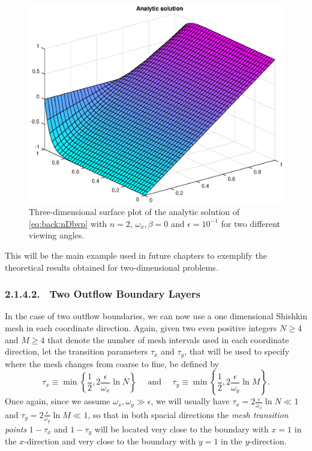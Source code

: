 \begin{example}
\begin{figure}[h!]
\begin{minipage}[t]{0.5\linewidth}
\end{minipage}
%
\begin{minipage}[t]{0.5\linewidth}
\includegraphics[width=0.83\linewidth]{figures/analytic_sol_new2b}
\end{minipage}
\caption{Three-dimensional surface plot of the analytic solution of
\eqref{eq:back:nDbvp} with $n=2$, $\omega_x,\beta=0$ and $\epsilon=10^{-1}$ for two different viewing angles.}
\label{fig:back:2D_analytic_sol}
\end{figure}

This will be the main example used in future chapters to exemplify the theoretical results obtained for two-dimensional problems.
\end{example}

\subsubsection{2.1.4.2. \ Two Outflow Boundary Layers}
In the case of two outflow boundaries, we can now use a one dimensional Shishkin mesh in each coordinate direction.
Again, given two even positive integers $N\geq 4$ and $M\geq 4$ that denote the
number of mesh intervals used in each coordinate direction, let the transition
parameters $\tau_x$ and $\tau_y$, that will be used to specify where the mesh
changes from coarse to fine, be defined by
%
\begin{equation}\label{eq:back:tau_xy}
\tau_x \equiv \min\left\{\frac12,2\frac{\epsilon}{\omega_x}  \ln N\right\}\quad\text{ and }\quad\tau_y \equiv \min\left\{\frac12,2\frac{\epsilon}{\omega_y} \ln M\right\}.
\end{equation}
%
Once again, since we assume $\omega_x,\omega_y\gg \epsilon$, we will usually
have $\tau_x=2\frac{\epsilon}{\omega_x}  \ln N\ll 1$ and
$\tau_y=2\frac{\epsilon}{\omega_y} \ln M\ll 1$, so that in both spacial
directions the \emph{mesh transition points} $1-\tau_x$ and $1-\tau_y$ will be
located very close to the boundary with $x=1$ in the $x$-direction and very
close to the boundary with $y=1$ in the $y$-direction.

